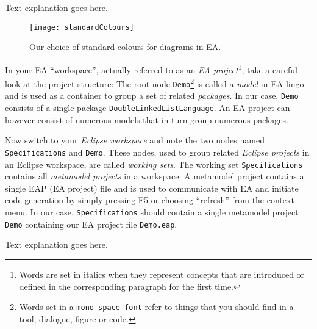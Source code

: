 \begin{enumerate}
\newpage
\texHeader
Text explanation goes here.
\pagebreak

\visHeader


\begin{figure}[htbp]
  \centering
  \texttt{[image: standardColours]}
  \caption{Our choice of standard colours for diagrams in EA.}
  \label{fig_standardColoursEA}
\end{figure}


In your EA ``workspace'', actually referred to as an \emph{EA project}\footnote{Words are set in italics when they represent concepts that are introduced or defined  in the corresponding paragraph for the first time.}, take a careful  look at the project structure:  The root node \texttt{Demo}\footnote{Words set  in a \texttt{mono-space font} refer to things that you should find in a tool,  dialogue, figure or code.} is called a \emph{model} in EA lingo and is used as a  container to group a set of related \emph{packages}. 
In our case, \texttt{Demo}  consists of a single package \texttt{DoubleLinkedListLanguage}.
An EA project can however consist of numerous models that in turn group  numerous packages.

Now switch to your \emph{Eclipse workspace} and note the two nodes named \texttt{Spe\-ci\-fi\-ca\-tions} and \texttt{Demo}.  These nodes, used to group related \emph{Eclipse projects} in an Eclipse workspace, are called \emph{working sets}.
The working set \texttt{Spe\-ci\-fi\-ca\-tions} contains all \emph{metamodel projects} in a  workspace.
A metamodel project contains a single EAP (EA project) file and is used to communicate with EA and initiate code generation by simply pressing F5 or choosing ``refresh'' from the context menu.
In our case, \texttt{Specifications} should contain a single metamodel project \texttt{Demo} containing our EA project file  \texttt{Demo.eap}.

\newpage
\texHeader
Text explanation goes here.
\pagebreak

\visHeader


\end{enumerate}
